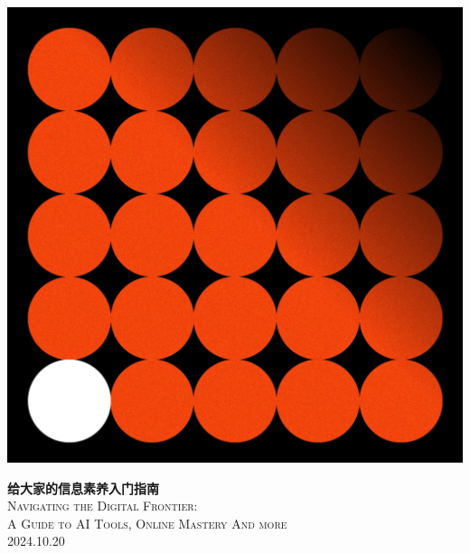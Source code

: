 \begin{titlepage}
    \centering
    \includegraphics[width=\textwidth,height=0.7\textheight]{pics/cover.jpg}
    
    \raggedright
    \vspace{0.6cm}
    \hspace*{1cm}
    \Huge{\textbf{给大家的信息素养入门指南}}\\[0.3cm]
    \Large{\hspace*{1.2cm}\textsc{Navigating the Digital Frontier:}\\ \hspace*{1.05cm} \textsc{A Guide to AI Tools, Online Mastery And more}}\\[0.3cm]
    \hspace*{1cm}
    \large{2024.10.20}
\end{titlepage}
